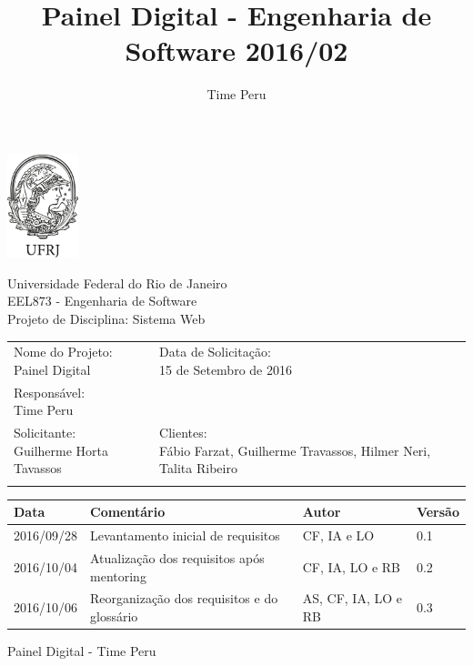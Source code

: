 \documentclass[a4paper, 12pt]{article}
\author{Time Peru}
\title{Painel Digital - Engenharia de Software 2016/02}
\begin{document}
\begin{minipage}[c][3cm][c]{3cm}
	\includegraphics[height=3cm]{img/ufrj_logo.png}
\end{minipage}
\begin{minipage}[c][3cm][c]{10cm}
	Universidade Federal do Rio de Janeiro \\
	EEL873 - Engenharia  de Software \\
	Projeto de Disciplina: Sistema Web
\end{minipage}

\begin{table}[ht]
	\centering

	\begin{tabular}{p{6cm}p{10cm}}
		\hline
		\cellcolor{gray} & \cellcolor{gray}\\
		\hline
		\pbox{20cm}{Nome do Projeto: \\ Painel Digital}
		&\pbox{20cm}{Data de Solicitação: \\ 15 de Setembro de 2016}\\[2ex]
		\hline
		\pbox{20cm}{Responsável: \\ Time Peru}\\[2ex]
		\hline
		\pbox{20cm}{Solicitante: \\ Guilherme Horta Tavassos}
		&\pbox{10cm}{Clientes: \\ Fábio Farzat, Guilherme Travassos, Hilmer Neri, Talita Ribeiro}\\[4ex]
		\hline
		\cellcolor{gray} & \cellcolor{gray}\\
		\hline
	\end{tabular}
\end{table}%

\begin{table}[ht]
	\rowcolors{1}{}{}
	\centering

	\begin{tabular}{p{2cm}p{8cm}p{4cm}p{1cm}}
		\hline
		\cellcolor{gray}Data&\cellcolor{gray}Comentário&\cellcolor{gray}Autor&\cellcolor{gray}Versão  \\
		\hline
		2016/09/28&Levantamento inicial de requisitos &CF, IA e LO&0.1\\
        2016/10/04&Atualiza\c{c}\~ao dos requisitos ap\'{o}s mentoring&CF, IA, LO e RB&0.2\\
        2016/10/06&Reorganiza\c{c}\~ao dos requisitos e do gloss\'{a}rio&AS, CF, IA, LO e RB&0.3\\
		\hline

	\end{tabular}
\end{table}%
\vspace{100pt}
\begin{center}
	\huge{Painel Digital - Time Peru}
	\vspace{95pt}
\end{center}
\newpage
\tableofcontents
\newpage
\end{document}
